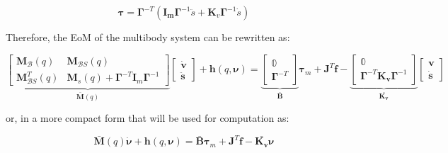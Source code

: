 \begin{equation}
    \label{eqn:mot_dyn_jointspace}
    \boldsymbol{\tau} = \boldsymbol{\Gamma} ^{-T} (\mathbf{I_m}\boldsymbol{\Gamma} ^{-1} \ddot{s} + \mathbf{K}_v \boldsymbol{\Gamma} ^{-1}\dot{s})
\end{equation}

Therefore, the \ac{EoM} of the multibody system can be rewritten as:

\begin{equation}
    \underbrace{\begin{bmatrix}
            \mathbf{M} _{\mathcal{B}}(q)     & \mathbf{M} _{\mathcal{B}S}(q)                                                      \\
            \mathbf{M} _{\mathcal{B}S} ^T(q) & \mathbf{M} _s(q) + \boldsymbol{\Gamma} ^{-T}\mathbf{I} _m\boldsymbol{\Gamma} ^{-1}
        \end{bmatrix}} _{\mathbf{\bar{M}}(q)}
    \begin{bmatrix}
        \dot{\mathrm{\mathbf{v}}} \\
        \ddot{\mathbf{s}}
    \end{bmatrix}+
    \mathbf{h}
    (q,\boldsymbol{\nu}) =
    \underbrace{\begin{bmatrix}
            \mathbb{0} \\
            \boldsymbol{\Gamma} ^{-T}
        \end{bmatrix}} _{\mathbf{\bar{B}}}
    \boldsymbol{\tau} _m
    +
    \mathbf{J} ^T
    \mathbf{f}
    -
    \underbrace{\begin{bmatrix}
            \mathbb{0} \\
            \boldsymbol{\Gamma} ^{-T}\mathbf{K _v}\boldsymbol{\Gamma} ^{-1}
        \end{bmatrix}} _\mathbf{\bar{K _v}}
    \begin{bmatrix}
        \mathrm{\mathbf{v}} \\
        \dot{\mathbf{s}}
    \end{bmatrix}
\end{equation}

or, in a more compact form that will be used for computation as:

\begin{equation}
    \mathbf{\bar{M}}(q)\dot{\boldsymbol{\nu}} + \mathbf{h}(q,\boldsymbol{\nu}) = \mathbf{\bar{B}}\boldsymbol{\tau} _m + \mathbf{J} ^T \mathbf{f} - \bar{\mathbf{K _v}}\boldsymbol{\nu}
\end{equation}

